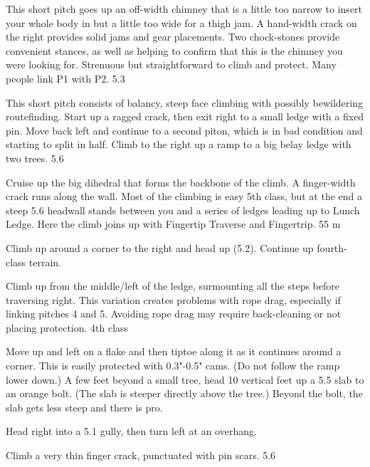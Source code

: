 \documentclass{tahquitz}
\begin{document}
 This short pitch goes up an off-width chimney that is a little too
narrow to insert your whole body in but a little too wide for a thigh jam.
A hand-width crack on the right provides solid jams and gear placements.
Two chock-stones provide convenient stances, as well as helping
to confirm that this is the chimney you were looking for. 
Strenuous but straightforward to climb and protect.
Many people link P1 with P2. 5.3

 This short pitch consists of balancy, steep face climbing with
possibly bewildering routefinding. Start up a ragged crack, then
exit right to a small ledge with a fixed pin.
Move back left and continue to a second piton, which is in bad condition
and starting to split in half. Climb to the right up a ramp to a big belay
ledge with two trees. 5.6

 Cruise up the big dihedral that forms the backbone of the climb. A
finger-width crack runs along the wall.
Most of the climbing is easy 5th class, but at the end a steep 5.6 headwall
stands between you and a series of ledges leading up to
Lunch Ledge. Here the climb joins up with Fingertip Traverse
and Fingertrip. 55 m


 Climb up around a corner to the right and head up (5.2).
Continue up fourth-class terrain.

 Climb up from the middle/left of the ledge, surmounting all the steps
before traversing right. This variation creates problems with rope drag, especially
if linking pitches 4 and 5. Avoiding rope drag may require back-cleaning or not
placing protection. 4th class

 Move up and left on a flake and then tiptoe along it as it
continues around a corner.  This is easily protected with 0.3"-0.5"
cams. (Do not follow the ramp lower down.)  A few feet beyond a small
tree, head 10 vertical feet up a 5.5 slab to an orange bolt. (The slab
is steeper directly above the tree.) Beyond the bolt, the slab gets
less steep and there is pro. 

 Head right into a 5.1 gully, then turn left at an overhang.

 Climb a very thin finger crack, punctuated with pin scars. 5.6

\upfriction
\end{document}
